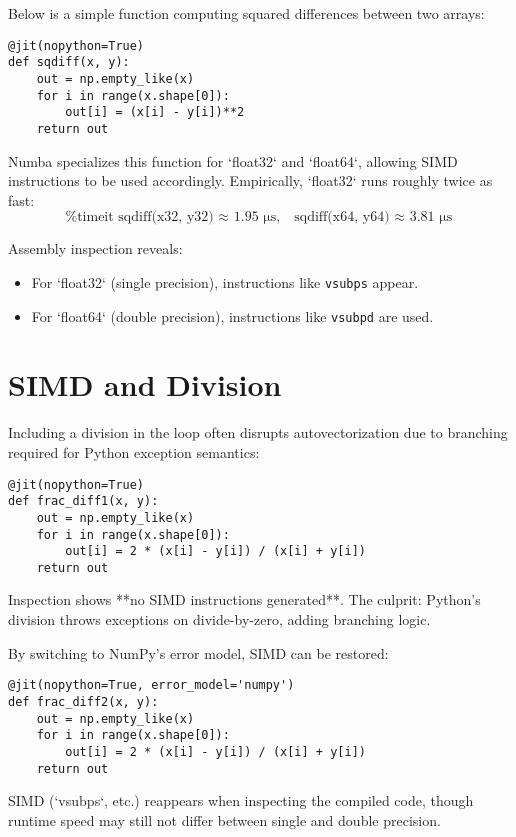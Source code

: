 \documentclass{book}
\begin{document}
Below is a simple function computing squared differences between two arrays:

\begin{lstlisting}
@jit(nopython=True)
def sqdiff(x, y):
    out = np.empty_like(x)
    for i in range(x.shape[0]):
        out[i] = (x[i] - y[i])**2
    return out
\end{lstlisting}

Numba specializes this function for `float32` and `float64`, allowing SIMD instructions to be used accordingly. Empirically, `float32` runs roughly twice as fast:
\[
\text{%
\]

Assembly inspection reveals:
\begin{itemize}
  \item For `float32` (single precision), instructions like \texttt{vsubps} appear.
  \item For `float64` (double precision), instructions like \texttt{vsubpd} are used.
\end{itemize}

\section{SIMD and Division}

Including a division in the loop often disrupts autovectorization due to branching required for Python exception semantics:

\begin{lstlisting}
@jit(nopython=True)
def frac_diff1(x, y):
    out = np.empty_like(x)
    for i in range(x.shape[0]):
        out[i] = 2 * (x[i] - y[i]) / (x[i] + y[i])
    return out
\end{lstlisting}

Inspection shows **no SIMD instructions generated**. The culprit: Python’s division throws exceptions on divide-by-zero, adding branching logic.

By switching to NumPy’s error model, SIMD can be restored:

\begin{lstlisting}
@jit(nopython=True, error_model='numpy')
def frac_diff2(x, y):
    out = np.empty_like(x)
    for i in range(x.shape[0]):
        out[i] = 2 * (x[i] - y[i]) / (x[i] + y[i])
    return out
\end{lstlisting}

SIMD (`vsubps`, etc.) reappears when inspecting the compiled code, though runtime speed may still not differ between single and double precision.
\end{document}
